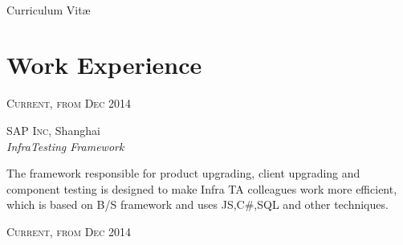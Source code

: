 \documentclass[UTF8,10pt]{article} %
\begin{document}
\color{text1} %


\par{\\ %
{\color{headings} Curriculum {Vit\ae}\\[15pt]\par} %
	

\begin{minipage}[t]{0.5\textwidth} %
\vspace{0pt} %
	

\section{Work Experience} 

{\raggedleft\textsc{Current, from Dec 2014}\par}

{\raggedright\large \textsc{SAP Inc}, Shanghai\\
\textit{InfraTesting Framework}\\[8pt]}

\normalsize{
The framework responsible for product upgrading, client upgrading and component testing is designed to make Infra TA colleagues work more efficient, which is based on B\//S framework and uses JS,C\#,SQL and other techniques.
}\\



{\raggedleft\textsc{Current, from Dec 2014}\par}


\end{minipage}}
\end{document}
